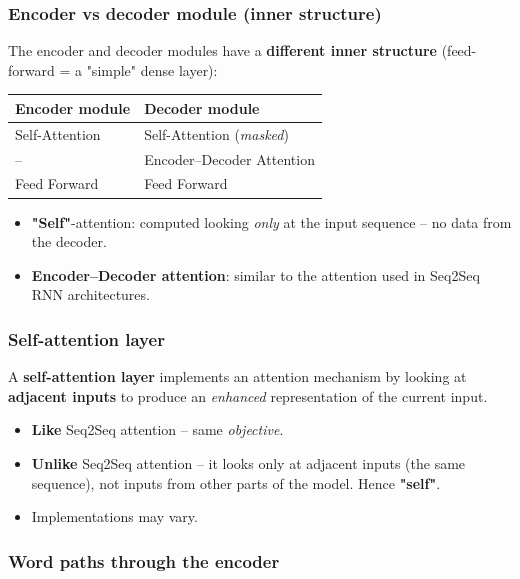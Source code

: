 \documentclass[10pt,a4paper]{article}
\begin{document}
	\subsubsection*{Encoder vs decoder module (inner structure)}

	The encoder and decoder modules have a \textbf{different inner structure} (feed-forward = a "simple" dense layer):
	\begin{center}
	\begin{tabular}{@{}ll@{}}
		\toprule
		\textbf{Encoder module} & \textbf{Decoder module} \\
		\midrule
		Self-Attention & Self-Attention (\emph{masked}) \\
		-- & Encoder--Decoder Attention \\
		Feed Forward & Feed Forward \\
		\bottomrule
	\end{tabular}
	\end{center}
	\begin{itemize}[leftmargin=*]
		\item \textbf{"Self"}-attention: computed looking \emph{only} at the input sequence -- no data from the decoder.
		\item \textbf{Encoder--Decoder attention}: similar to the attention used in Seq2Seq RNN architectures.
	\end{itemize}

	\subsubsection*{Self-attention layer}

	\begin{definitionbox}
		A \textbf{self-attention layer} implements an attention mechanism by looking at \textbf{adjacent inputs} to produce an \emph{enhanced} representation of the current input.
	\end{definitionbox}

	\begin{itemize}[leftmargin=*]
		\item \textbf{Like} Seq2Seq attention -- same \emph{objective}.
		\item \textbf{Unlike} Seq2Seq attention -- it looks only at adjacent inputs (the same sequence), not inputs from other parts of the model. Hence \textbf{"self"}.
		\item Implementations may vary.
	\end{itemize}

	\subsubsection*{Word paths through the encoder}
\end{document}
